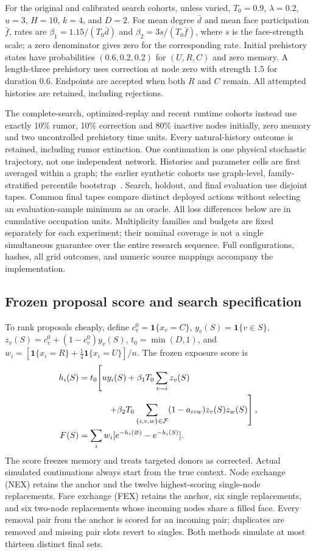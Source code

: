 \documentclass[preprint,11pt,sort&compress]{elsarticle}
\newcommand{\ind}{\mathbf{1}}
\newcommand{\Fset}{\mathcal{F}}
\begin{document}
For the original and calibrated search cohorts, unless varied, $T_0=0.9$, $\lambda=0.2$, $u=3$, $H=10$, $k=4$, and $D=2$. For mean degree $\bar d$ and mean face participation $\bar f$, rates are $\beta_1=1.15/(T_0\bar d)$ and $\beta_2=3s/(T_0\bar f)$, where $s$ is the face-strength scale; a zero denominator gives zero for the corresponding rate. Initial prehistory states have probabilities $(0.6,0.2,0.2)$ for $(U,R,C)$ and zero memory. A length-three prehistory uses correction at node zero with strength $1.5$ for duration $0.6$. Endpoints are accepted when both $R$ and $C$ remain. All attempted histories are retained, including rejections.

The complete-search, optimized-replay and recent runtime cohorts instead use exactly 10\% rumor, 10\% correction and 80\% inactive nodes initially, zero memory and two uncontrolled prehistory time units. Every natural-history outcome is retained, including rumor extinction. One continuation is one physical stochastic trajectory, not one independent network. Histories and parameter cells are first averaged within a graph; the earlier synthetic cohorts use graph-level, family-stratified percentile bootstrap~\cite{efron1979}. Search, holdout, and final evaluation use disjoint tapes. Common final tapes compare distinct deployed actions without selecting an evaluation-sample minimum as an oracle. All loss differences below are in cumulative occupation units. Multiplicity families and budgets are fixed separately for each experiment; their nominal coverage is not a single simultaneous guarantee over the entire research sequence. Full configurations, hashes, all grid outcomes, and numeric source mappings accompany the implementation.


\subsection{Frozen proposal score and search specification}\label{sec:search_details}
To rank proposals cheaply, define $c_v^0=\ind\{x_v=C\}$, $y_v(S)=\ind\{v\in S\}$, $z_v(S)=c_v^0+(1-c_v^0)y_v(S)$, $t_0=\min(D,1)$, and
$w_i=[\ind\{x_i=R\}+\tfrac14\ind\{x_i=U\}]/n$. The frozen exposure score is
\begin{align}
 h_i(S)&=t_0\!\left[u y_i(S)+\beta_1T_0\sum_{v\sim i}z_v(S)\right.\notag\\
 &\hspace{12mm}\left.+\beta_2T_0\sum_{\{i,v,w\}\in\Fset}(1-a_{ivw})z_v(S)z_w(S)\right],\notag\\
 F(S)&=\sum_iw_i[e^{-h_i(\varnothing)}-e^{-h_i(S)}].\label{eq:score}
\end{align}
The score freezes memory and treats targeted donors as corrected. Actual simulated continuations always start from the true context. Node exchange (NEX) retains the anchor and the twelve highest-scoring single-node replacements. Face exchange (FEX) retains the anchor, six single replacements, and six two-node replacements whose incoming nodes share a filled face. Every removal pair from the anchor is scored for an incoming pair; duplicates are removed and missing pair slots revert to singles. Both methods simulate at most thirteen distinct final sets.
\end{document}
